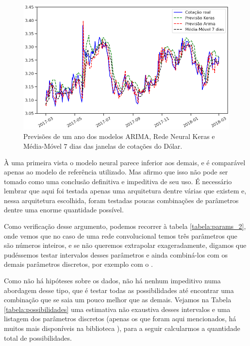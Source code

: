 \begin{figure}[htb]
\centering
\includegraphics[width=13.1cm]{figuras/series_previsoes_ano_1}
\caption{Previsões de um ano dos modelos ARIMA, Rede Neural Keras e Média-Móvel $7$ dias das janelas de cotações do Dólar.}
\label{fig:previsoes_ano_1}
\end{figure}


À uma primeira vista o modelo neural parece inferior aos demais, e é comparável apenas ao modelo de referência utilizado. Mas afirmo que isso não pode ser tomado como uma conclusão definitiva e impeditiva de seu uso. É necessário lembrar que aqui foi testada apenas uma arquitetura dentre várias que existem e, nessa arquitetura escolhida, foram testadas poucas combinações de parâmetros dentre uma enorme quantidade possível.

Como verificação desse argumento, podemos recorrer à tabela \ref{tabela:params_2}, onde vemos que no caso de uma rede convolucional temos três parâmetros que são números inteiros, e se não queremos extrapolar exageradamente, digamos que pudéssemos testar intervalos desses parâmetros e ainda combiná-los com os demais parâmetros discretos, por exemplo com o . 

Como não há hipóteses sobre os dados, não há nenhum impeditivo numa abordagem desse tipo, que é testar todas as possibilidades até encontrar uma combinação que se saia um pouco melhor que as demais. Vejamos na Tabela \ref{tabela:possibilidades} uma estimativa não exaustiva desses intervalos e uma listagem dos parâmetros discretos (apenas os que foram aqui mencionados, há muitos mais disponíveis na biblioteca ), para a seguir calcularmos a quantidade total de possibilidades.

